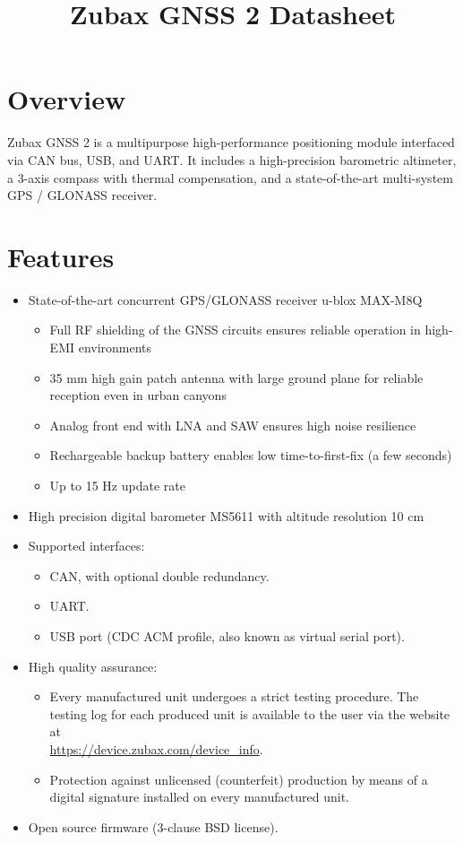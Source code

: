 \documentclass{zubaxdoc}
\title{Zubax GNSS 2 Datasheet}
\begin{document}
\frontmatter

\begin{titlepage}

\section*{Overview}

Zubax GNSS 2 is a multipurpose high-performance positioning module interfaced via CAN bus, USB, and UART. It includes a high-precision barometric altimeter, a 3-axis compass with thermal compensation, and a state-of-the-art multi-system GPS / GLONASS receiver.
\section*{Features}

\begin{itemize}
    \item State-of-the-art concurrent GPS/GLONASS receiver u-blox MAX-M8Q
    \begin{itemize}
    		\item Full RF shielding of the GNSS circuits ensures reliable operation in high-EMI environments
    		\item 35 mm high gain patch antenna with large ground plane for reliable reception even in urban canyons
    		\item Analog front end with LNA and SAW ensures high noise resilience
    		\item Rechargeable backup battery enables low time-to-first-fix (a few seconds)
    		\item Up to 15 Hz update rate
    	\end{itemize}
	\item High precision digital barometer MS5611 with  altitude resolution 10 cm
	\item Supported interfaces:
    \begin{itemize}
        \item CAN, with optional double redundancy.
        \item UART.
        \item USB port (CDC ACM profile, also known as virtual serial port).
    \end{itemize}
    \item High quality assurance:
    \begin{itemize}
        \item Every manufactured unit undergoes a strict testing procedure.
        The testing log for each produced unit is available to the user via the website at\\
        \url{https://device.zubax.com/device_info}.
        \item Protection against unlicensed (counterfeit) production by means of a digital signature
        installed on every manufactured unit.
    \end{itemize}
    \item Open source firmware (3-clause BSD license).
\end{itemize}


\end{titlepage}
\end{document}
